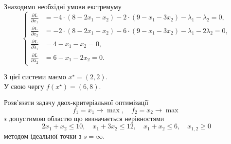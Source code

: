 \begin{solution}
    Знаходимо необхідні умови екстремуму
    \begin{equation*}
        \left\{
            \begin{aligned}
                \frac{\partial L}{\partial x_1} &= - 4 \cdot (8 - 2 x_1 - x_2) - 2 \cdot (9 - x_1 - 3 x_2) - \lambda_1 - \lambda_2 = 0, \\
                \frac{\partial L}{\partial x_2} &= - 2 \cdot (8 - 2 x_1 - x_2) - 6 \cdot (9 - x_1 - 3 x_2) - \lambda_1 - 2 \lambda_2 = 0, \\
                \frac{\partial L}{\partial \lambda_1} &= 4 - x_1 - x_2 = 0, \\
                \frac{\partial L}{\partial \lambda_2} &= 6 - x_1 - 2 x_2 = 0.
            \end{aligned}
        \right.
    \end{equation*}
    
    З цієї системи маємо $x^\star = \left( 2, 2 \right)$. \\
    
    У свою чергу $f(x^\star) = \left( 6, 8 \right)$.
\end{solution}

\newpage


    

\begin{problem}
    Розв'язати задачу двох-критеріальної оптимізації \[ f_1 = x_1 \to \max, \quad f_2 = x_2 \to \max \] з допустимою областю що визначається нерівностями \[ 2 x_1 + x_2 \le 10, \quad x_1 + 3 x_2 \le 12, \quad x_1 + x_2 \le 6, \quad x_{1, 2} \ge 0 \] методом ідеальної точки з $s = \infty$.
\end{problem}

